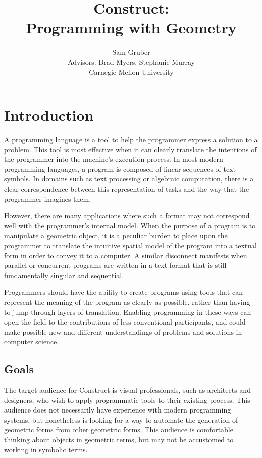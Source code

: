 \documentclass[twoside,openright,11pt]{report}
\title{\bf {\Huge Construct}:\\{\LARGE Programming with Geometry}}
\author{{\Large Sam Gruber}\\Advisors: Brad Myers, Stephanie Murray\\Carnegie Mellon University}
\begin{document}
\maketitle

\chapter{Introduction}
\label{chap:intro}

A programming language is a tool to help the programmer express a solution to a problem.
This tool is most effective when it can clearly translate the intentions of the programmer into the machine's execution process. 
In most modern programming languages, a program is composed of linear sequences of text symbols.
In domains such as text processing or algebraic computation, there is a clear correspondence between this representation of tasks and the way that the programmer imagines them.

However, there are many applications where such a format may not correspond well with the programmer's internal model. 
When the purpose of a program is to manipulate a geometric object, it is a peculiar burden to place upon the programmer to translate the intuitive spatial model of the program into a textual form in order to convey it to a computer. 
A similar disconnect manifests when parallel or concurrent programs are written in a text format that is still fundamentally singular and sequential.

Programmers should have the ability to create programs using tools that can represent the meaning of the program as clearly as possible, rather than having to jump through layers of translation. 
Enabling programming in these ways can open the field to the contributions of less-conventional participants, and could make possible new and different understandings of problems and solutions in computer science.

\section{Goals}
\label{sec:goals}

The target audience for Construct is visual professionals, such as architects and designers, who wish to apply programmatic tools to their existing process.
This audience does not necessarily have experience with modern programming systems, but nonetheless is looking for a way to automate the generation of geometric forms from other geometric forms.
This audience is comfortable thinking about objects in geometric terms, but may not be accustomed to working in symbolic terms.
\end{document}
